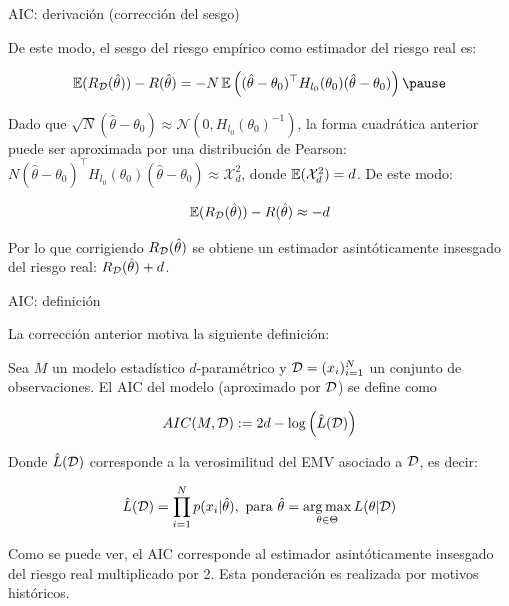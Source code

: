 \documentclass[handout, 9pt]{beamer}
\begin{document}
\begin{frame}{AIC: derivación (corrección del sesgo)}


De este modo, el sesgo del riesgo empírico como estimador del riesgo real es:

\begin{equation*}
	\E(R_\datos(\hat{\theta})) - R(\hat{\theta}) = -N \E\left((\hat{\theta}-\theta_0)^\top H_{l_0}(\theta_0) (\hat{\theta}-\theta_0)\right)\pause
\end{equation*}

Dado que $\sqrt{N}\left(\hat{\theta}-\theta_0\right)\approx\mathcal{N}\left(0,H_{l_0}(\theta_0)^{-1}\right)$, la forma cuadrática anterior puede ser aproximada por una distribución de Pearson: $N(\hat{\theta}-\theta_0)^\top H_{l_0}(\theta_0) (\hat{\theta}-\theta_0)\approx\mathcal{X}^2_d$, donde $\operatorname{\mathbb{E}}(\mathcal{X}^2_d)=d$. De este modo:

\begin{equation*}
	\operatorname{\mathbb{E}}(R_{\mathcal D}(\hat{\theta})) - R(\hat{\theta}) \approx -d
\end{equation*}\pause

Por lo que corrigiendo $R_{\mathcal D}(\hat{\theta})$ se obtiene un estimador asintóticamente insesgado del riesgo real: $R_{\mathcal D}(\hat{\theta})+d$.

\end{frame}

\begin{frame}{AIC: definición}

La corrección anterior motiva la siguiente definición:

\begin{definition}[AIC]
	Sea $M$ un modelo estadístico $d$-paramétrico y ${\mathcal D}=(x_i)_{i=1}^N$ un conjunto de observaciones. El AIC del modelo (aproximado por ${\mathcal D}$) se define como
	
	\begin{equation*}
		AIC(M,{\mathcal D}):=2d-\log\left(\hat{L}({\mathcal D})\right)
	\end{equation*}
	
	Donde $\hat{L}({\mathcal D})$ corresponde a la verosimilitud del EMV asociado a ${\mathcal D}$, es decir:
	
	\begin{equation*}
		\hat{L}({\mathcal D}) = \prod_{i=1}^N p(x_i|\hat{\theta}),\text{ para } \hat{\theta} = \operatorname*{arg\,max}_{\theta\in\Theta} L(\theta|{\mathcal D})
	\end{equation*}
\end{definition}\pause

Como se puede ver, el AIC corresponde al estimador asintóticamente insesgado del riesgo real multiplicado por 2. Esta ponderación es realizada por motivos históricos.
	
\end{frame}
\end{document}

